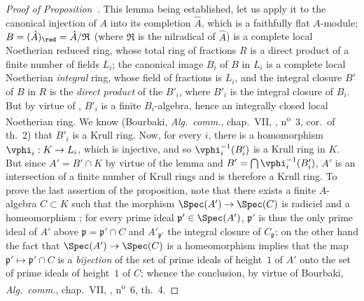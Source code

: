 \begin{proof}[Proof of Proposition~{\rm{}}]
This lemma being established, let us apply it to the canonical injection of $A$ into its completion $\hat{A}$, which is a faithfully flat $A$-module; $B=(\hat{A})_\red=\hat{A}/\mathfrak{R}$ (where $\mathfrak{R}$ is the nilradical of $\hat{A}$) is a complete local Noetherian reduced ring, whose total ring of fractions $R$ is a direct product of a finite number of fields $L_i$; the canonical image $B_i$ of $B$ in $L_i$ is a complete local Noetherian \emph{integral} ring, whose field of fractions is $L_i$, and the integral closure $B'$ of $B$ in $R$ is the \emph{direct product} of the $B'_i$, where $B'_i$ is the integral closure of $B_i$.
But by virtue of , $B'_i$ is a finite $B_i$-algebra, hence an integrally closed local Noetherian ring.
We know (Bourbaki, \emph{Alg.~comm.}, chap.~VII, , n\textsuperscript{o}~3, cor.~of th.~2) that $B'_i$ is a Krull ring.
Now, for every $i$, there is a homomorphism $\vphi_i:K\to L_i$, which is injective, and so $\vphi_i^{-1}(B'_i)$ is a Krull ring in $K$.
But since $A'=B'\cap K$ by virtue of the lemma and $B'=\bigcap\vphi_i^{-1}(B'_i)$, $A'$ is an intersection of a finite number of Krull rings and is therefore a Krull ring.
To prove the last assertion of the proposition, note that there exists a finite $A$-algebra $C\subset K$ such that the morphism $\Spec(A')\to\Spec(C)$ is radiciel and a homeomorphism ; for every prime ideal $\mathfrak{p}'\in\Spec(A')$, $\mathfrak{p}'$ is thus the only prime ideal of $A'$ above $\mathfrak{p}=\mathfrak{p}'\cap C$ and $A'_{\mathfrak{p}'}$ the integral closure of $C_\mathfrak{p}$; on the other hand the fact that $\Spec(A')\to\Spec(C)$ is a homeomorphism implies that the map $\mathfrak{p}'\mapsto\mathfrak{p}'\cap C$ is a \emph{bijection} of the set of prime ideals of height~$1$ of $A'$ onto the set of prime ideals of height~$1$ of $C$; whence the conclusion, by virtue of Bourbaki, \emph{Alg.~comm.}, chap.~VII, , n\textsuperscript{o}~6, th.~4.
\end{proof}

